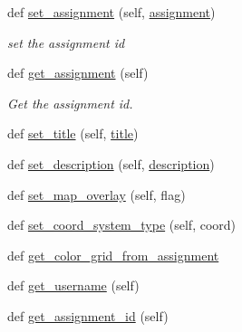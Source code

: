 \begin{DoxyCompactItemize}
def \mbox{\hyperlink{classbridges_1_1bridges_1_1_bridges_add46441bec1c93095c48adc724b90e12}{set\+\_\+assignment}} (self, \mbox{\hyperlink{classbridges_1_1bridges_1_1_bridges_a2752e73a21f14efb9382217fcd431960}{assignment}})
\begin{DoxyCompactList}\small\item\em set the assignment id \end{DoxyCompactList}\item 
def \mbox{\hyperlink{classbridges_1_1bridges_1_1_bridges_a1e7bd56f6a3beb03c91fc989cf3f7eb8}{get\+\_\+assignment}} (self)
\begin{DoxyCompactList}\small\item\em Get the assignment id. \end{DoxyCompactList}\item 
def \mbox{\hyperlink{classbridges_1_1bridges_1_1_bridges_a3b0c629c1ae0beaac05fa9d90846c423}{set\+\_\+title}} (self, \mbox{\hyperlink{classbridges_1_1bridges_1_1_bridges_ad939b2c56ddf76088fb9eb6aa0552e44}{title}})
\item 
def \mbox{\hyperlink{classbridges_1_1bridges_1_1_bridges_aba86088c031b505bbe88dbc530bf1331}{set\+\_\+description}} (self, \mbox{\hyperlink{classbridges_1_1bridges_1_1_bridges_ae7a9987daf7c1fbdb19d87954bb64aa0}{description}})
\item 
def \mbox{\hyperlink{classbridges_1_1bridges_1_1_bridges_ae9ed34b5878d9d120949da0b7e4d2911}{set\+\_\+map\+\_\+overlay}} (self, flag)
\item 
def \mbox{\hyperlink{classbridges_1_1bridges_1_1_bridges_a6bc905490b1995234f88f47af9aa8a17}{set\+\_\+coord\+\_\+system\+\_\+type}} (self, coord)
\item 
def \mbox{\hyperlink{classbridges_1_1bridges_1_1_bridges_a11c2be346fba56589955894c5f84747d}{get\+\_\+color\+\_\+grid\+\_\+from\+\_\+assignment}}
\item 
def \mbox{\hyperlink{classbridges_1_1bridges_1_1_bridges_abf6fdb19db336c2ed14987fdd89d65fe}{get\+\_\+username}} (self)
\item 
def \mbox{\hyperlink{classbridges_1_1bridges_1_1_bridges_a94f39f11368031ad33800aac0bac2f7d}{get\+\_\+assignment\+\_\+id}} (self)
\end{DoxyCompactItemize}
